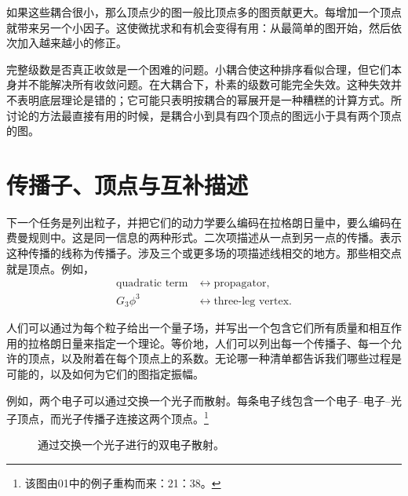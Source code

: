 如果这些耦合很小，那么顶点少的图一般比顶点多的图贡献更大。每增加一个顶点就带来另一个小因子。这使微扰求和有机会变得有用：从最简单的图开始，然后依次加入越来越小的修正。

完整级数是否真正收敛是一个困难的问题。小耦合使这种排序看似合理，但它们本身并不能解决所有收敛问题。在大耦合下，朴素的级数可能完全失效。这种失效并不表明底层理论是错的；它可能只表明按耦合的幂展开是一种糟糕的计算方式。所讨论的方法最直接有用的时候，是耦合小到具有四个顶点的图远小于具有两个顶点的图。

\begin{classroomqa}
\end{classroomqa}

\section{传播子、顶点与互补描述}

下一个任务是列出粒子，并把它们的动力学要么编码在拉格朗日量中，要么编码在费曼规则中。这是同一信息的两种形式。二次项描述从一点到另一点的传播。表示这种传播的线称为传播子。涉及三个或更多场的项描述线相交的地方。那些相交点就是顶点。例如，
\begin{equation}
\begin{aligned}
\text{quadratic term}
&\longleftrightarrow \text{propagator},\\
G_3\phi^3
&\longleftrightarrow \text{three-leg vertex}.
\end{aligned}
\end{equation}

人们可以通过为每个粒子给出一个量子场，并写出一个包含它们所有质量和相互作用的拉格朗日量来指定一个理论。等价地，人们可以列出每一个传播子、每一个允许的顶点，以及附着在每个顶点上的系数。无论哪一种清单都告诉我们哪些过程是可能的，以及如何为它们的图指定振幅。

例如，两个电子可以通过交换一个光子而散射。每条电子线包含一个电子--电子--光子顶点，而光子传播子连接这两个顶点。\footnote{该图由01中的例子重构而来：21：38。}

\begin{figure}[htbp]
\centering
{}
\caption{通过交换一个光子进行的双电子散射。}
\end{figure}

